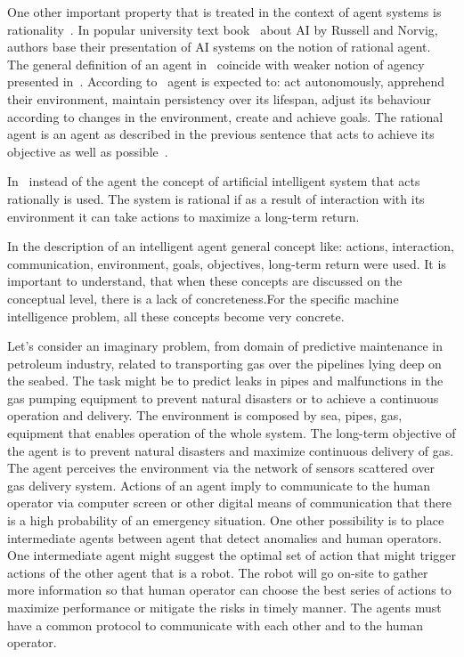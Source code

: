 \documentclass[english, 12pt, a4paper, elec, utf8, online]{aaltothesis}
\begin{document}
One other important property that is treated in the context of agent systems is rationality~\cite{wooldridge_jennings94}. In popular university text book~\cite{AIMA} about AI by Russell and Norvig, authors base their presentation of AI systems on the notion of rational agent. The general definition of an agent in~\cite{AIMA} coincide with weaker notion of agency presented in~\cite{wooldridge_jennings94}. According to~\cite{AIMA}  agent is expected to: act autonomously, apprehend their environment, maintain persistency over its lifespan, adjust its behaviour according to changes in the environment, create and achieve goals. The rational agent is an agent as described in the previous sentence that acts to achieve its objective as well as possible~\cite{AIMA}. 

In~\cite{Jung2018} instead of the agent the concept of artificial intelligent system that acts rationally is used. The system is rational if as a result of interaction with its environment it can take actions to maximize a long-term return.

In the description of an intelligent agent general concept like: actions, interaction, communication, environment, goals, objectives, long-term return were used. It is important to understand, that when these concepts are discussed on the conceptual level, there is a lack of concreteness.For the specific machine intelligence problem, all these concepts become very concrete.

Let's consider an imaginary problem, from domain of predictive maintenance in petroleum industry, related to transporting gas over the pipelines lying deep on the seabed. The task might be to predict leaks in pipes and malfunctions in the gas pumping equipment to prevent natural disasters or to achieve a continuous operation and delivery. The environment is composed by sea, pipes, gas, equipment that enables operation of the whole system. The long-term objective of the agent is to prevent natural disasters and maximize continuous delivery of gas. The agent perceives the environment via the network of sensors scattered over gas delivery system. Actions of an agent imply to communicate to the human operator via computer screen or other digital means of communication that there is a high probability of an emergency situation. One other possibility is to place intermediate agents between agent that detect anomalies and human operators. One intermediate agent might suggest the optimal set of action that might trigger actions of the other agent that is a robot. The robot will go on-site to gather more information so that human operator can choose the best series of actions to maximize performance or mitigate the risks in timely manner. The agents must have a common protocol to communicate with each other and to the human operator.
\end{document}
